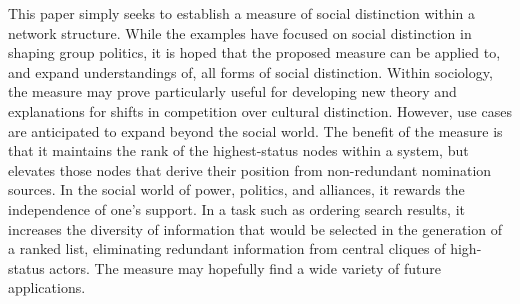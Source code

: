 \documentclass[12pt]{article}
\begin{document}
This paper simply seeks to establish a measure of social distinction within a network structure. While the examples have focused on social distinction in shaping group politics, it is hoped that the proposed measure can be applied to, and expand understandings of, all forms of social distinction. Within sociology, the measure may prove particularly useful for developing new theory and explanations for shifts in competition over cultural distinction. However, use cases are anticipated to expand beyond the social world. The benefit of the measure is that it maintains the rank of the highest-status nodes within a system, but elevates those nodes that derive their position from non-redundant nomination sources. In the social world of power, politics, and alliances, it rewards the independence of one's support. In a task such as ordering search results, it increases the diversity of information that would be selected in the generation of a ranked list, eliminating redundant information from central cliques of high-status actors. The measure may hopefully find a wide variety of future applications. 


\newpage


\newpage




\newpage
\end{document}
